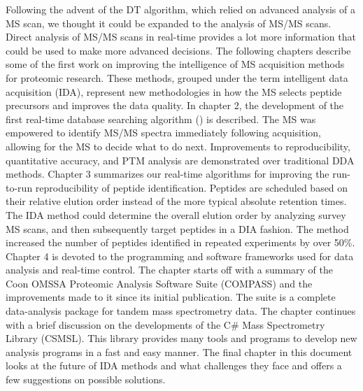 Following the advent of the DT algorithm, which relied on advanced analysis of a MS scan, we thought it could be expanded to the analysis of MS/MS scans. Direct analysis of MS/MS scans in real-time provides a lot more information that could be used to make more advanced decisions. The following chapters describe some of the first work on improving the intelligence of MS acquisition methods for proteomic research. These methods, grouped under the term intelligent data acquisition (IDA), represent new methodologies in how the MS selects peptide precursors and improves the data quality. In chapter 2, the development of the first real-time database searching algorithm (\inseq{}) is described. The MS was empowered to identify MS/MS spectra immediately following acquisition, allowing for the MS to decide what to do next. Improvements to reproducibility, quantitative accuracy, and PTM analysis are demonstrated over traditional DDA methods. Chapter 3 summarizes our real-time algorithms for improving the run-to-run reproducibility of peptide identification. Peptides are scheduled based on their relative elution order instead of the more typical absolute retention times. The IDA method could determine the overall elution order by analyzing survey MS scans, and then subsequently target peptides in a DIA fashion. The method increased the number of peptides identified in repeated experiments by over 50\%. Chapter 4 is devoted to the programming and software frameworks used for data analysis and real-time control. The chapter starts off with a summary of the Coon OMSSA Proteomic Analysis Software Suite (COMPASS) and the improvements made to it since its initial publication.\cite{compass} The suite is a complete data-analysis package for tandem mass spectrometry data. The chapter continues with a brief discussion on the developments of the C\# Mass Spectrometry Library (CSMSL). This library provides many tools and programs to develop new analysis programs in a fast and easy manner. The final chapter in this document looks at the future of IDA methods and what challenges they face and offers a few suggestions on possible solutions.


